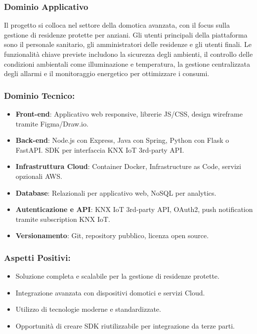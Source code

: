 \documentclass[a4paper,12pt]{article}
\begin{document}
\subsubsection*{Dominio Applicativo}
Il progetto si colloca nel settore della domotica avanzata, con il focus sulla gestione di residenze protette per anziani. Gli utenti principali della piattaforma sono il personale sanitario, gli amministratori delle residenze e gli utenti finali. Le funzionalità chiave previste includono la sicurezza degli ambienti, il controllo delle condizioni ambientali come illuminazione e temperatura, la gestione centralizzata degli allarmi e il monitoraggio energetico per ottimizzare i consumi.

\subsubsection*{Dominio Tecnico:}
\begin{itemize}
    \item \textbf{Front-end}: Applicativo web responsive, librerie JS/CSS, design wireframe tramite Figma/Draw.io.
    \item \textbf{Back-end}: Node.js con Express, Java con Spring, Python con Flask o FastAPI. SDK per interfaccia KNX IoT 3rd-party API.
    \item \textbf{Infrastruttura Cloud}: Container Docker, Infrastructure as Code, servizi opzionali AWS.
    \item \textbf{Database}: Relazionali per applicativo web, NoSQL per analytics.
    \item \textbf{Autenticazione e API}: KNX IoT 3rd-party API, OAuth2, push notification tramite subscription KNX IoT.
    \item \textbf{Versionamento}: Git, repository pubblico, licenza open source.
\end{itemize}

\subsubsection*{Aspetti Positivi:}
\begin{itemize}
    \item Soluzione completa e scalabile per la gestione di residenze protette.
    \item Integrazione avanzata con dispositivi domotici e servizi Cloud.
    \item Utilizzo di tecnologie moderne e standardizzate.
    \item Opportunità di creare SDK riutilizzabile per integrazione da terze parti.
\end{itemize}
\end{document}
